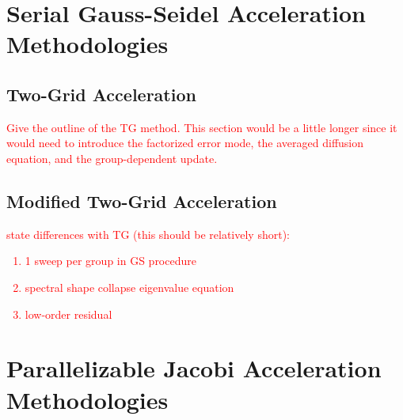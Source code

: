 \documentclass[preprint,10pt]{elsarticle}
\newcommand{\tcr}[1]{\textcolor{red}{#1}}
\begin{document}
\section{Serial Gauss-Seidel Acceleration Methodologies} \label{sec::GS}

\subsection{Two-Grid Acceleration}

\tcr{Give the outline of the TG method. This section would be a little longer since it would need to introduce the factorized error mode, the averaged diffusion equation, and the group-dependent update.}

\subsection{Modified Two-Grid Acceleration}

\tcr
{
state differences with TG (this should be relatively short):
\begin{enumerate}
\item 1 sweep per group in GS procedure
\item spectral shape collapse eigenvalue equation
\item low-order residual
\end{enumerate}
}

\section{Parallelizable Jacobi Acceleration Methodologies} \label{sec::Jac}
\end{document}
